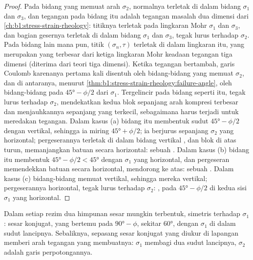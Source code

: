 \begin{proof}
Pada bidang yang memuat arah $\sigma_2$, normalnya terletak di dalam bidang $\sigma_1$ dan $\sigma_3$, dan tegangan pada bidang itu adalah tegangan masalah dua dimensi dari \cref{ch:b1:stress-strain-rheology}: titiknya terletak pada lingkaran Mohr $\sigma_1$ dan $\sigma_3$, dan bagian gesernya terletak di dalam bidang $\sigma_1$ dan $\sigma_3$, tegak lurus terhadap $\sigma_2$. Pada bidang lain mana pun, titik $(\sigma_n, \tau)$ terletak di dalam lingkaran itu, yang merupakan yang terbesar dari ketiga lingkaran Mohr keadaan tegangan tiga dimensi (diterima dari teori tiga dimensi). Ketika tegangan bertambah, garis Coulomb karenanya pertama kali disentuh oleh bidang-bidang yang memuat $\sigma_2$, dan di antaranya, menurut \cref{thm:b1:stress-strain-rheology:failure-angle}, oleh bidang-bidang pada $\ang{45} - \phi/2$ dari $\sigma_1$. Tergelincir pada bidang seperti itu, tegak lurus terhadap $\sigma_2$, mendekatkan kedua blok sepanjang arah kompresi terbesar dan menjauhkannya sepanjang yang terkecil, sebagaimana harus terjadi untuk meredakan tegangan. Dalam kasus (a) bidang itu membentuk sudut $\ang{45} - \phi/2$ dengan vertikal, sehingga ia miring $\ang{45} + \phi/2$; ia berjurus sepanjang $\sigma_2$ yang horizontal; pergeserannya terletak di dalam bidang vertikal , dan blok di atas turun, memanjangkan batuan secara horizontal: sebuah . Dalam kasus (b) bidang itu membentuk $\ang{45} - \phi/2 < \ang{45}$ dengan $\sigma_1$ yang horizontal, dan pergeseran memendekkan batuan secara horizontal, mendorong  ke atas: sebuah . Dalam kasus (c) bidang-bidang memuat vertikal, sehingga mereka vertikal; pergeserannya horizontal, tegak lurus terhadap $\sigma_2$: , pada $\ang{45} - \phi/2$ di kedua sisi $\sigma_1$ yang horizontal.
\end{proof}

Dalam setiap rezim dua himpunan sesar mungkin terbentuk, simetris terhadap $\sigma_1$: sesar konjugat, yang bertemu pada $\ang{90} - \phi$, sekitar \ang{60}, dengan $\sigma_1$ di dalam sudut lancipnya. Sebaliknya, sepasang sesar konjugat yang diukur di lapangan memberi arah tegangan yang membuatnya: $\sigma_1$ membagi dua sudut lancipnya, $\sigma_2$ adalah garis perpotongannya.


